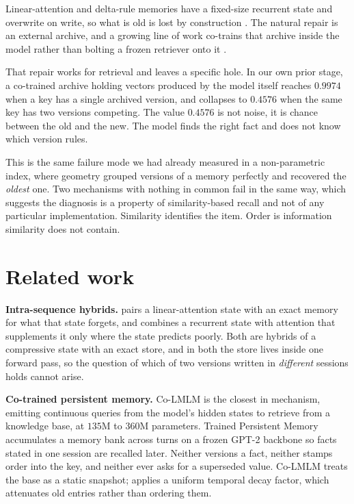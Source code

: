 \documentclass[11pt,a4paper]{article}
\begin{document}
Linear-attention and delta-rule memories have a fixed-size recurrent state and overwrite on write, so
what is old is lost by construction \citep{deltanet,gateddeltanet}. The natural repair is an external
archive, and a growing line of work co-trains that archive inside the model rather than bolting a
frozen retriever onto it \citep{colmlm,persistmem,lmlm}.

That repair works for retrieval and leaves a specific hole. In our own prior stage, a co-trained
archive holding vectors produced by the model itself reaches $0.9974$ when a key has a single archived
version, and collapses to $0.4576$ when the same key has two versions competing. The value $0.4576$ is
not noise, it is chance between the old and the new. The model finds the right fact and does not know
which version rules.

This is the same failure mode we had already measured in a non-parametric index, where geometry
grouped versions of a memory perfectly and recovered the \emph{oldest} one. Two mechanisms with
nothing in common fail in the same way, which suggests the diagnosis is a property of
similarity-based recall and not of any particular implementation. Similarity identifies the item.
Order is information similarity does not contain.

\section{Related work}

\textbf{Intra-sequence hybrids.} \citet{hola} pairs a linear-attention state with an exact memory for
what that state forgets, and \citet{ham} combines a recurrent state with attention that supplements it
only where the state predicts poorly. Both are hybrids of a compressive state with an exact store, and
in both the store lives inside one forward pass, so the question of which of two versions written in
\emph{different} sessions holds cannot arise.

\textbf{Co-trained persistent memory.} Co-LMLM \citep{colmlm} is the closest in mechanism, emitting
continuous queries from the model's hidden states to retrieve from a knowledge base, at $135$M to
$360$M parameters. Trained Persistent Memory \citep{persistmem} accumulates a memory bank across turns
on a frozen GPT-2 backbone so facts stated in one session are recalled later. Neither versions a fact,
neither stamps order into the key, and neither ever asks for a superseded value. Co-LMLM treats the
base as a static snapshot; \citet{persistmem} applies a uniform temporal decay factor, which
attenuates old entries rather than ordering them.
\end{document}
